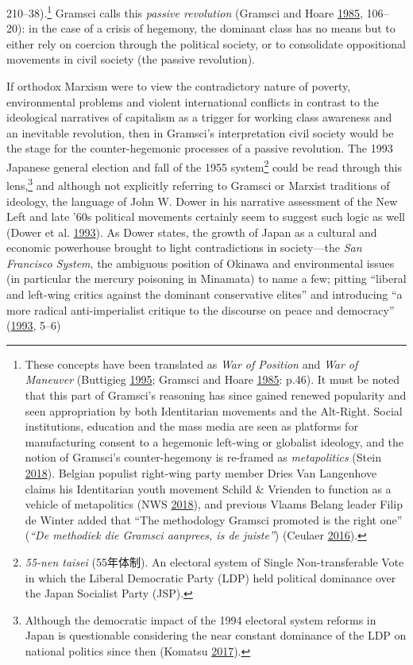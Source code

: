 \documentclass[10pt,british,A4paper,oneside]{memoir}
\begin{document}
210--38).\footnote{These concepts have been translated as \emph{War of
  Position} and \emph{War of Maneuver} (Buttigieg
  \protect\hyperlink{ref-buttigieg_gramsci_1995}{1995}; Gramsci and
  Hoare \protect\hyperlink{ref-gramsci_selections_1985}{1985}: p.46). It
  must be noted that this part of Gramsci's reasoning has since gained
  renewed popularity and seen appropriation by both Identitarian
  movements and the Alt-Right. Social institutions, education and the
  mass media are seen as platforms for manufacturing consent to a
  hegemonic left-wing or globalist ideology, and the notion of Gramsci's
  counter-hegemony is re-framed as \emph{metapolitics} (Stein
  \protect\hyperlink{ref-stein_jeff_2018}{2018}). Belgian populist
  right-wing party member Dries Van Langenhove claims his Identitarian
  youth movement Schild \& Vrienden to function as a vehicle of
  metapolitics (NWS \protect\hyperlink{ref-nws_van_2018}{2018}), and
  previous Vlaams Belang leader Filip de Winter added that ``The
  methodology Gramsci promoted is the right one'' (\emph{``De methodiek die
  Gramsci aanprees, is de juiste''}) (Ceulaer
  \protect\hyperlink{ref-ceulaer_6_2016}{2016}).} Gramsci calls this
\emph{passive revolution} (Gramsci and Hoare
\protect\hyperlink{ref-gramsci_selections_1985}{1985}, 106--20): in the
case of a crisis of hegemony, the dominant class has no means but to
either rely on coercion through the political society, or to consolidate
oppositional movements in civil society (the passive revolution).

If orthodox Marxism were to view the contradictory nature of poverty,
environmental problems and violent international conflicts in contrast
to the ideological narratives of capitalism as a trigger for working
class awareness and an inevitable revolution, then in Gramsci's
interpretation civil society would be the stage for the counter-hegemonic
processes of a passive revolution. The 1993 Japanese general election and
fall of the 1955 system\footnote{\emph{55-nen taisei} (55年体制). An
  electoral system of Single Non-transferable Vote in which the Liberal
  Democratic Party (LDP) held political dominance over the Japan
  Socialist Party (JSP).} could be read through this lens,\footnote{Although
  the democratic impact of the 1994 electoral system reforms in Japan is
  questionable considering the near constant dominance of the LDP on national politics since then (Komatsu
  \protect\hyperlink{ref-komatsu_first_2017}{2017}).} and although not
explicitly referring to Gramsci or Marxist traditions of ideology, the
language of John W. Dower in his narrative assessment of the New Left
and late '60s political movements certainly seem to suggest such logic
as well (Dower et al. \protect\hyperlink{ref-dower_peace_1993}{1993}).
As Dower states, the growth of Japan as a cultural and economic
powerhouse brought to light contradictions in society---the \emph{San
Francisco System}, the ambiguous position of Okinawa and environmental
issues (in particular the mercury poisoning in Minamata) to name a few;
pitting ``liberal and left-wing critics against the dominant
conservative elites'' and introducing ``a more radical anti-imperialist
critique to the discourse on peace and democracy''
(\protect\hyperlink{ref-dower_peace_1993}{1993}, 5--6)
\end{document}
